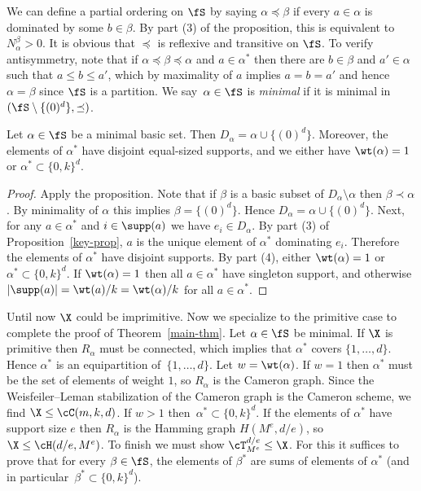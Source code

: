 We can define a partial ordering on $\fS$ by saying $\alpha \preceq \beta$ if every $a \in \alpha$ is dominated by some $b \in \beta$.
By part (3) of the proposition, this is equivalent to $N^\beta_\alpha > 0$.
It is obvious that $\preceq$ is reflexive and transitive on $\fS$.
To verify antisymmetry, note that if $\alpha \preceq \beta \preceq \alpha$ and $a \in \alpha^*$ then there are $b \in \beta$ and $a' \in \alpha$ such that $a \le b \le a'$, which by maximality of $a$ implies $a = b = a'$ and hence $\alpha = \beta$ since $\fS$ is a partition.
We say~$\alpha \in \fS$ is \emph{minimal} if it is minimal in $(\fS \setminus \{(0)^d\}, \preceq)$.

\begin{cor}
    Let $\alpha \in \fS$ be a minimal basic set.
    Then $D_\alpha = \alpha \cup \{(0)^d\}$.
    Moreover, the elements of $\alpha^*$ have disjoint equal-sized supports,
    and we either have $\wt(\alpha) = 1$ or $\alpha^* \subset \{0, k\}^d$.
\end{cor}
\begin{proof}
    Apply the proposition.
    Note that if $\beta$ is a basic subset of $D_\alpha \setminus \alpha$ then $\beta \prec \alpha$.
    By minimality of $\alpha$ this implies $\beta = \{(0)^d\}$.
    Hence $D_\alpha = \alpha \cup \{(0)^d\}$.
    Next,
    for any $a \in \alpha^*$ and $i \in \supp(a)$ we have $e_i \in D_\alpha$.
    By part (3) of Proposition~\ref{key-prop}, $a$ is the unique element of $\alpha^*$ dominating $e_i$.
    Therefore the elements of $\alpha^*$ have disjoint supports.
    By part (4), either $\wt(\alpha) = 1$ or $\alpha^* \subset \{0, k\}^d$.
    If $\wt(\alpha) = 1$ then all $a \in \alpha^*$ have singleton support,
    and otherwise $|\supp(a)| = \wt(a) / k = \wt(\alpha) / k$ for all $a \in \alpha^*$.
\end{proof}

Until now $\X$ could be imprimitive.
Now we specialize to the primitive case to complete the proof of Theorem~\ref{main-thm}.
Let $\alpha \in \fS$ be minimal.
If $\X$ is primitive then $R_\alpha$ must be connected,
which implies that $\alpha^*$ covers $\{1, \dots, d\}$.
Hence $\alpha^*$ is an equipartition of~$\{1, \dots ,d\}$.
Let $w = \wt(\alpha)$.
If $w = 1$ then $\alpha^*$ must be the set of elements of weight $1$, so $R_\alpha$ is the Cameron graph.
Since the Weisfeiler--Leman stabilization of the Cameron graph is the Cameron scheme, we find $\X \le \cC(m, k, d)$.
If $w > 1$ then~$\alpha^* \subset \{0, k\}^d$.
If the elements of $\alpha^*$ have support size $e$ 
then $R_\alpha$ is the Hamming graph $H(M^e, d/e)$, so $\X \le \cH(d/e, M^e)$.
To finish we must show $\cT_{M^e}^{d/e} \le \X$.
For this it suffices to prove that for every $\beta \in \fS$, the elements of $\beta^*$ are sums of elements of $\alpha^*$ (and in particular~$\beta^* \subset \{0, k\}^d$).

